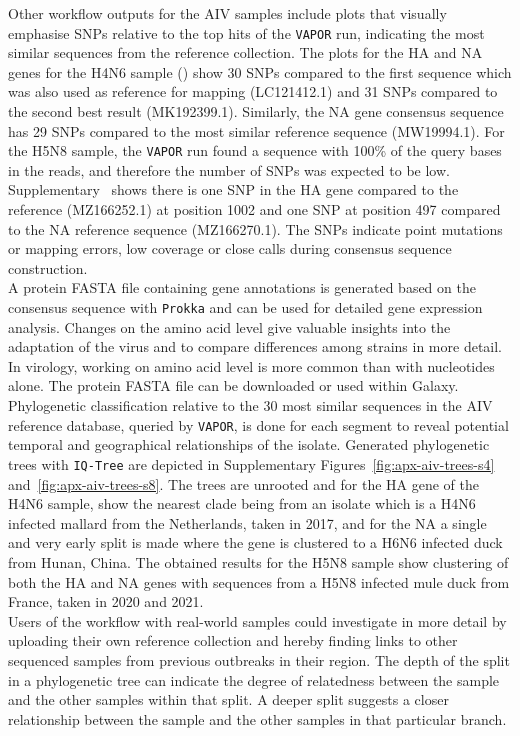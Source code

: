 Other workflow outputs for the \ac{AIV} samples include plots that visually emphasise \acp{SNP} relative to the top hits of the \texttt{VAPOR} run, indicating the most similar sequences from the reference collection. The plots for the \ac{HA} and \ac{NA} genes for the H4N6 sample () show 30 \acp{SNP} compared to the first sequence which was also used as reference for mapping (LC121412.1) and 31 \acp{SNP} compared to the second best result (MK192399.1). Similarly, the \ac{NA} gene consensus sequence has 29 \acp{SNP} compared to the most similar reference sequence (MW19994.1). For the H5N8 sample, the \texttt{VAPOR} run found a sequence with 100\% of the query bases in the reads, and therefore the number of \acp{SNP} was expected to be low. Supplementary~ shows there is one \ac{SNP} in the \ac{HA} gene compared to the reference (MZ166252.1) at position 1002 and one \ac{SNP} at position 497 compared to the \ac{NA} reference sequence (MZ166270.1). The \acp{SNP} indicate point mutations or mapping errors, low coverage or close calls during consensus sequence construction. \\
A protein FASTA file containing gene annotations is generated based on the consensus sequence with \texttt{Prokka} and can be used for detailed gene expression analysis. Changes on the amino acid level give valuable insights into the adaptation of the virus and to compare differences among strains in more detail. In virology, working on amino acid level is more common than with nucleotides alone. The protein FASTA file can be downloaded or used within Galaxy.\\
Phylogenetic classification relative to the 30 most similar sequences in the \ac{AIV} reference database, queried by \texttt{VAPOR}, is done for each segment to reveal potential temporal and geographical relationships of the isolate. Generated phylogenetic trees with \texttt{IQ-Tree} are depicted in Supplementary Figures~\ref{fig:apx-aiv-trees-s4} and~\ref{fig:apx-aiv-trees-s8}. The trees are unrooted and for the \ac{HA} gene of the H4N6 sample, show the nearest clade being from an isolate which is a H4N6 infected mallard from the Netherlands, taken in 2017, and for the \ac{NA} a single and very early split is made where the gene is clustered to a H6N6 infected duck from Hunan, China. The obtained results for the H5N8 sample show clustering of both the \ac{HA} and \ac{NA} genes with sequences from a H5N8 infected mule duck from France, taken in 2020 and 2021.\\
Users of the workflow with real-world samples could investigate in more detail by uploading their own reference collection and hereby finding links to other sequenced samples from previous outbreaks in their region. The depth of the split in a phylogenetic tree can indicate the degree of relatedness between the sample and the other samples within that split. A deeper split suggests a closer relationship between the sample and the other samples in that particular branch.

